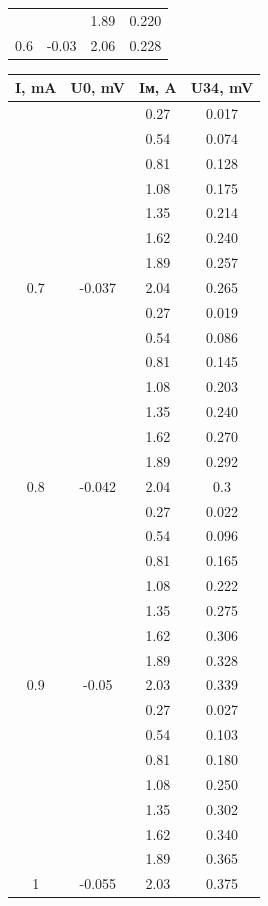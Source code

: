 \documentclass{article}
\begin{document}
\begin{figure}[H]
\begin{subfigure}{.5\textwidth}
\begin{tabular}{|c|c|c|c|}
        & & 1.89 & 0.220  \\
        \multirow{-8}{*}{0.6}         & \multirow{-8}{*}{-0.03}        & 2.06 & 0.228  \\\hline
    \end {tabular}
    \end{subfigure}%
    \begin{subfigure}{.5\textwidth}
        \centering
    \begin{tabular}{|c|c|c|c|}
        \hline
        I, mA & U0, mV & Iм, A & U34, mV \\\hline
        & & 0.27 & 0.017  \\
        & & 0.54 & 0.074  \\
        & & 0.81 & 0.128  \\
        & & 1.08 & 0.175  \\
        & & 1.35 & 0.214  \\
        & & 1.62 & 0.240  \\
        & & 1.89 & 0.257  \\
        \multirow{-8}{*}{0.7}         & \multirow{-8}{*}{-0.037}       & 2.04 & 0.265  \\\hline
        & & 0.27 & 0.019  \\ 
        & & 0.54 & 0.086  \\ 
        & & 0.81 & 0.145  \\ 
        & & 1.08 & 0.203  \\ 
        & & 1.35 & 0.240  \\ 
        & & 1.62 & 0.270  \\ 
        & & 1.89 & 0.292  \\ 
        \multirow{-8}{*}{0.8}         & \multirow{-8}{*}{-0.042}       & 2.04 & 0.3    \\\hline
        & & 0.27 & 0.022  \\ 
        & & 0.54 & 0.096  \\ 
        & & 0.81 & 0.165  \\ 
        & & 1.08 & 0.222  \\ 
        & & 1.35 & 0.275  \\ 
        & & 1.62 & 0.306  \\ 
        & & 1.89 & 0.328  \\ 
        \multirow{-8}{*}{0.9}         & \multirow{-8}{*}{-0.05}        & 2.03 & 0.339  \\\hline
        & & 0.27 & 0.027  \\ 
        & & 0.54 & 0.103  \\ 
        & & 0.81 & 0.180  \\ 
        & & 1.08 & 0.250  \\ 
        & & 1.35 & 0.302  \\ 
        & & 1.62 & 0.340  \\ 
        & & 1.89 & 0.365  \\ 
        \multirow{-8}{*}{1}           & \multirow{-8}{*}{-0.055}       & 2.03 & 0.375 \\\hline
        \end{tabular}
    \end{subfigure}%
\end{figure}
\end{document}
